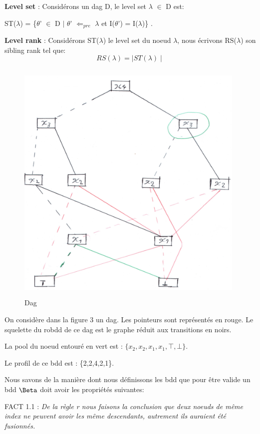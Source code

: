 \documentclass[french]{article}
\begin{document}
\textbf{Level set} : Considérons un dag D, le level set \(\lambda\) \(\in\) D est:
\begin{center}
ST(\(\lambda\)) = \{\(\theta\)’ \(\in\) D \(\mid\) \(\theta\)’ \(\Leftarrow_{pre}\) \(\lambda\) et I(\(\theta\)’) = I(\(\lambda\))\} . 
\end{center}
\textbf{Level rank} : Considérons ST(\(\lambda\)) le level set du noeud \(\lambda\), nous écrivons RS(\(\lambda\)) son sibling rank tel que:
\[ RS(\lambda) = \mid ST(\lambda)\mid \]
\newpage
\begin{figure}[htp]
    \centering
    \includegraphics[width=11cm, height=12cm]{tree21}
    \caption{Dag}
    \label{fig:Figure2}
\end{figure}
On considère dans la figure 3 un dag. Les pointeurs sont représentés en rouge. Le squelette du robdd de ce dag est le graphe réduit aux transitions en noirs.

La pool du noeud entouré en vert est : \(\{x_2,x_2,x_1,x_1,\top,\bot\}\). 

Le profil de ce bdd est : \{2,2,4,2,1\}.

\vspace{5mm} 

Nous savons de la manière dont nous définissons les bdd que pour être valide un bdd \(\Beta\) doit avoir les propriétés suivantes:

FACT 1.1 : \emph{De la règle r nous faisons la conclusion que deux noeuds de même index ne peuvent avoir les même descendants, autrement ils auraient été fusionnés.}
\end{document}
